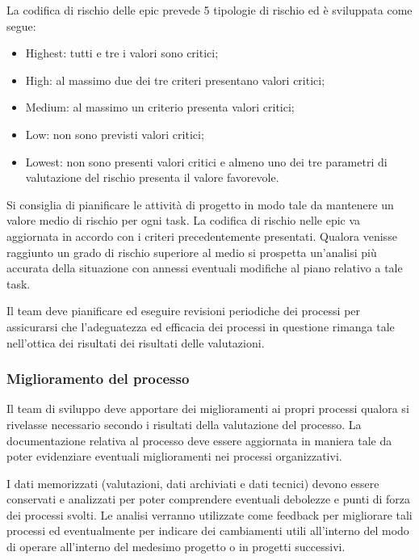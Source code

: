 La codifica di rischio delle epic prevede 5 tipologie di rischio ed è sviluppata come segue:
\begin{itemize}
    \item Highest: tutti e tre i valori sono critici;
    \item High: al massimo due dei tre criteri presentano valori critici;
    \item Medium: al massimo un criterio presenta valori critici;
    \item Low: non sono previsti valori critici;
    \item Lowest: non sono presenti valori critici e almeno uno dei tre parametri di valutazione del rischio presenta il valore favorevole.
\end{itemize}

Si consiglia di pianificare le attività di progetto in modo tale da mantenere un valore medio di rischio per ogni task. La codifica di rischio nelle epic va aggiornata in accordo con i criteri precedentemente presentati. Qualora venisse raggiunto un grado di rischio superiore al medio si prospetta un'analisi più accurata della situazione con annessi eventuali modifiche al piano relativo a tale task.

\myparagraph{}Il team deve pianificare ed eseguire revisioni periodiche dei processi per assicurarsi che l'adeguatezza ed efficacia dei processi in questione rimanga tale nell'ottica dei risultati dei risultati delle valutazioni.

\subsubsection{Miglioramento del processo}

\myparagraph{}Il team di sviluppo deve apportare dei miglioramenti ai propri processi qualora si rivelasse necessario secondo i risultati della valutazione del processo. La documentazione relativa al processo deve essere aggiornata in maniera tale da poter evidenziare eventuali miglioramenti nei processi organizzativi.

\myparagraph{}I dati memorizzati (valutazioni, dati archiviati e dati tecnici) devono essere conservati e analizzati per poter comprendere eventuali debolezze e punti di forza dei processi svolti. Le analisi verranno utilizzate come feedback per migliorare tali processi ed eventualmente per indicare dei cambiamenti utili all'interno del modo di operare all'interno del medesimo progetto o in progetti successivi.
